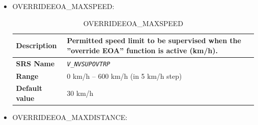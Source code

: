 \documentclass{template/openetcs}
\begin{document}
\begin{itemize}
\begin{longtable}{|l|l|}
				\hline
				
			\end{longtable}
			
		\item OVERRIDEEOA\_MAXSPEED:
		
			\begin{longtable}{|l|l|}
				\caption{OVERRIDEEOA\_MAXSPEED}\\ 																				
				\hline
				
					\begin{minipage}[t]{0.22\linewidth} \textbf{Description}	\end{minipage} 
				&	\begin{minipage}[t]{0.78\linewidth} Permitted speed limit to be supervised when the ”override EOA” function is active (km/h). \end{minipage} \\
				
				\hline
				
					\begin{minipage}[t]{0.22\linewidth} \textbf{SRS Name}	\end{minipage} 
				&	\begin{minipage}[t]{0.78\linewidth} \emph{\texttt{V\_NVSUPOVTRP}} \end{minipage} \\
				
				\hline
																																
					\begin{minipage}[t]{0.22\linewidth} \textbf{Range}	\end{minipage} 
				&	\begin{minipage}[t]{0.78\linewidth} 0 km/h – 600 km/h (in 5 km/h step) \end{minipage} \\
								
				\hline
										
					\begin{minipage}[t]{0.22\linewidth} \textbf{Default value}	\end{minipage} 
				&	\begin{minipage}[t]{0.78\linewidth} 30 km/h \end{minipage} \\
				
				\hline
				
			\end{longtable}
					
		\item OVERRIDEEOA\_MAXDISTANCE:
		

\end{itemize}
\end{document}
